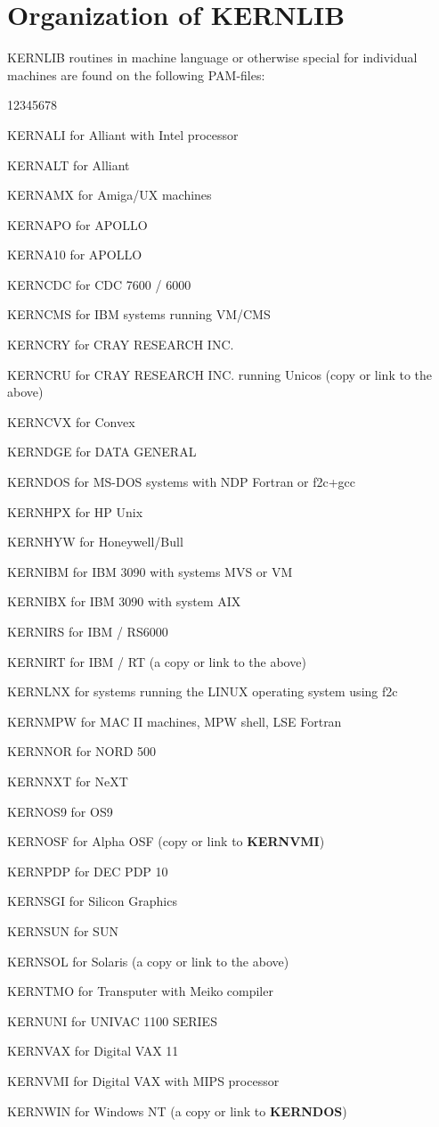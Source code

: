 \chapter{Organization of KERNLIB}

KERNLIB routines in machine language or otherwise special
for individual machines are found on the following PAM-files:

\begin{DLtt}{12345678}
\item[KERNALI]   for  Alliant with Intel processor
\item[KERNALT]   for  Alliant
\item[KERNAMX]   for  Amiga/UX machines
\item[KERNAPO]   for  APOLLO
\item[KERNA10]   for  APOLLO
\item[KERNCDC]   for  CDC 7600 / 6000
\item[KERNCMS]   for  IBM systems running VM/CMS
\item[KERNCRY]   for  CRAY RESEARCH INC.
\item[KERNCRU]   for  CRAY RESEARCH INC. running Unicos (copy or link to the above)
\item[KERNCVX]   for  Convex
\item[KERNDGE]   for  DATA GENERAL
\item[KERNDOS]   for  MS-DOS systems with NDP Fortran or f2c+gcc
\item[KERNHPX]   for  HP Unix
\item[KERNHYW]   for  Honeywell/Bull
\item[KERNIBM]   for  IBM 3090 with systems MVS or VM
\item[KERNIBX]   for  IBM 3090 with system AIX
\item[KERNIRS]   for  IBM / RS6000
\item[KERNIRT]   for  IBM / RT (a copy or link to the above)
\item[KERNLNX]   for  systems running the LINUX operating system using f2c
\item[KERNMPW]   for  MAC II machines, MPW shell, LSE Fortran
\item[KERNNOR]   for  NORD 500
\item[KERNNXT]   for  NeXT
\item[KERNOS9]   for  OS9
\item[KERNOSF]   for  Alpha OSF (copy or link to {\bf KERNVMI})
\item[KERNPDP]   for  DEC PDP 10
\item[KERNSGI]   for  Silicon Graphics
\item[KERNSUN]   for  SUN
\item[KERNSOL]   for  Solaris (a copy or link to the above)
\item[KERNTMO]   for  Transputer with Meiko compiler
\item[KERNUNI]   for  UNIVAC 1100 SERIES
\item[KERNVAX]   for  Digital VAX 11
\item[KERNVMI]   for  Digital VAX with MIPS processor
\item[KERNWIN]   for  Windows NT (a copy or link to {\bf KERNDOS})
\end{DLtt}

